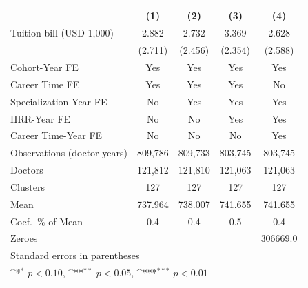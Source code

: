 {
\def\sym#1{\ifmmode^{#1}\else\(^{#1}\)\fi}
\begin{tabular}{l*{4}{c}}
\hline\hline
                    &\multicolumn{1}{c}{(1)}         &\multicolumn{1}{c}{(2)}         &\multicolumn{1}{c}{(3)}         &\multicolumn{1}{c}{(4)}         \\
\hline
Tuition bill (USD 1,000)&       2.882         &       2.732         &       3.369         &       2.628         \\
                    &     (2.711)         &     (2.456)         &     (2.354)         &     (2.588)         \\
[1em]
Cohort-Year FE      &         Yes         &         Yes         &         Yes         &         Yes         \\
[1em]
Career Time FE      &         Yes         &         Yes         &         Yes         &          No         \\
[1em]
Specialization-Year FE&          No         &         Yes         &         Yes         &         Yes         \\
[1em]
HRR-Year FE         &          No         &          No         &         Yes         &         Yes         \\
[1em]
Career Time-Year FE &          No         &          No         &          No         &         Yes         \\
\hline
Observations (doctor-years)&     809,786         &     809,733         &     803,745         &     803,745         \\
Doctors             &     121,812         &     121,810         &     121,063         &     121,063         \\
Clusters            &         127         &         127         &         127         &         127         \\
Mean                &     737.964         &     738.007         &     741.655         &     741.655         \\
Coef.\ \% of Mean   &         0.4         &         0.4         &         0.5         &         0.4         \\
Zeroes              &                     &                     &                     &    306669.0         \\
\hline\hline
\multicolumn{5}{l}{\footnotesize Standard errors in parentheses}\\
\multicolumn{5}{l}{\footnotesize \sym{*} \(p<0.10\), \sym{**} \(p<0.05\), \sym{***} \(p<0.01\)}\\
\end{tabular}
}
